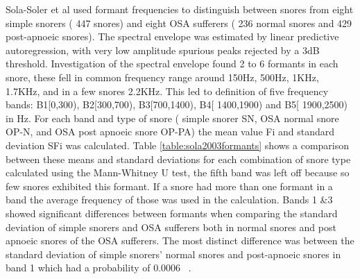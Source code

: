 Sola-Soler et al used formant frequencies to distinguish between snores from eight simple snorers ( 447 snores) and eight OSA sufferers ( 236 normal snores and 429 post-apnoeic snores). The spectral envelope was estimated by linear predictive autoregression, with very low amplitude spurious peaks rejected by a 3dB threshold. Investigation of the spectral envelope found 2 to 6 formants in each snore, these fell in common frequency range around 150Hz, 500Hz, 1KHz, 1.7KHz, and in a few snores 2.2KHz. This led to definition of five frequency bands: B1[0,300), B2[300,700), B3[700,1400), B4[ 1400,1900) and B5[ 1900,2500) in Hz. For each band and type of snore ( simple snorer SN, OSA normal snore OP-N, and OSA post apnoeic snore OP-PA) the mean value Fi and standard deviation SFi was calculated. Table \ref{table:sola2003formants} shows a comparison between these means and standard deviations for each combination of snore type calculated using the Mann-Whitney U test, the fifth band was left off because so few snores exhibited this formant. If a snore had more than one formant in a band the average frequency of those was used in the calculation. Bands 1 \&3 showed significant differences between formants when comparing the standard deviation of simple snorers and OSA sufferers both in normal snores and post apnoeic snores of the OSA sufferers. The most distinct difference was between the standard deviation of simple snorers’ normal snores and post-apnoeic snores in band 1 which had a probability of 0.0006 ~\cite{sola2003spectral}.

